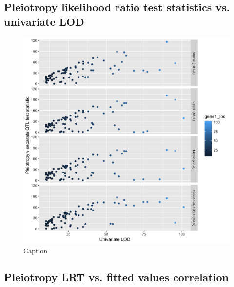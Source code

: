 \documentclass{article}
\begin{document}
\subsection{Pleiotropy likelihood ratio test statistics vs. univariate LOD}

\begin{figure}
    \centering
    \includegraphics[width = \textwidth]{2018-12-04_lrt-v-univariate-lod.jpg}
    \caption{Caption}
    \label{fig:lod}
\end{figure}


\subsection{Pleiotropy LRT vs. fitted values correlation}
\end{document}
